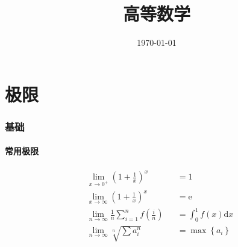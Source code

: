 \documentclass{article}
\title{高等数学}
\author{}
\date{\today}
\begin{document}
\hypersetup{
    hidelinks,
    allcolors = black,
    breaklinks = true
}

\renewcommand{\Re}{\operatorname{Re}}
\renewcommand{\Im}{\operatorname{Im}}

\def\e{\mathrm e}
\def\i{\mathrm i}
\def\d{\mathrm d}
\def\C{\mathrm C}
\def\sr{\mathbb R}
\def\sn{\mathbb N}
\def\snp{\mathbb N^+}
\def\sc{\mathbb C}
\def\sz{\mathbb Z}
\def\vpsi{\boldsymbol\psi}
\def\sech{\mathrm{sech}}
\def\csch{\mathrm{csch}}

\newcommand{\abs}[1]{\left|#1\right|}
\newcommand{\norm}[1]{\left\Vert#1\right\Vert}
\newcommand{\p}[1]{\left(#1\right)}
\newcommand{\br}[1]{\left[#1\right]}
\newcommand{\B}[1]{\left\{#1\right\}}
\newcommand{\vct}[3]{\left\{#1,#2,#3\right\}} %
\newcommand{\jacobi}[2]{\frac{\partial\p{#1}}{\partial\p{#2}}}

\begin{titlepage}
    \maketitle
\end{titlepage}

\tableofcontents
\newpage

\part{极限}

\section{基础}

\subsection{常用极限}

\[\begin{aligned}
         & \lim_{x\to0^+}{\p{1+\frac1x}^x}                     &  & =1                  \\
         & \lim_{x\to\infty}{\p{1+\frac1x}^x}                  &  & =\e                 \\
         & \lim_{n\to\infty}{\frac1n\sum_{i=1}^nf\p{\frac in}} &  & =\int_0^1f\p{x}\d x \\
         & \lim_{n\to\infty}{\sqrt[n]{\sum a_i^n}}             &  & =\max{\B{a_i}}
    \end{aligned}\]
\end{document}
